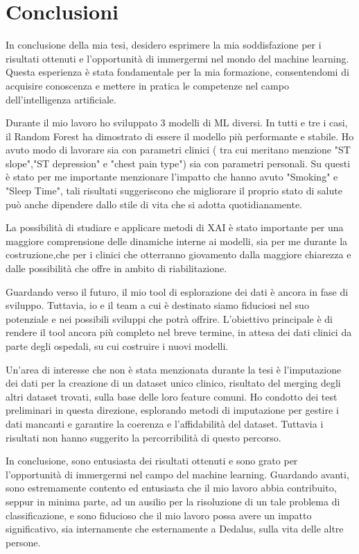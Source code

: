 \chapter*{Conclusioni}
\label{ch:conclusioni}

\begin{flushleft}
In conclusione della mia tesi, desidero esprimere la mia soddisfazione per i risultati ottenuti e l'opportunità di immergermi nel mondo del machine learning. Questa esperienza è stata fondamentale per la mia formazione, consentendomi di acquisire conoscenza e mettere in pratica le competenze nel campo dell'intelligenza artificiale.

Durante il mio lavoro ho sviluppato 3 modelli di ML diversi.  In tutti e tre i casi, il Random Forest ha dimostrato di essere il modello più performante e stabile.
Ho avuto modo di lavorare sia con parametri clinici ( tra cui meritano menzione "ST slope","ST depression" e "chest pain type") sia con parametri personali.
Su questi è stato per me importante menzionare l'impatto che hanno avuto "Smoking" e "Sleep Time", tali risultati suggeriscono che migliorare il proprio stato di salute può anche dipendere dallo stile di vita che si adotta quotidianamente.

La possibilità di studiare e applicare metodi di XAI è stato importante per una maggiore comprensione delle dinamiche interne ai modelli, sia per me durante la costruzione,che per i clinici che  otterranno giovamento dalla maggiore chiarezza
e dalle possibilità che offre in ambito di riabilitazione.

Guardando verso il futuro, il mio tool di esplorazione dei dati è ancora in fase di sviluppo. Tuttavia, io e il team a cui è destinato siamo fiduciosi nel suo potenziale e nei possibili sviluppi che potrà offrire. L'obiettivo principale è di rendere il tool ancora più completo nel breve termine, in attesa dei dati clinici da parte degli ospedali, su cui costruire i nuovi modelli.

Un'area di interesse che non è stata menzionata durante la tesi è l'imputazione dei dati per la creazione di un dataset unico clinico, risultato del merging degli altri dataset trovati, sulla base delle loro feature comuni. 
Ho condotto dei test preliminari in questa direzione, esplorando metodi di imputazione per gestire i dati mancanti e garantire la coerenza e l'affidabilità del dataset. 
Tuttavia i risultati non hanno suggerito la percorribilità di questo percorso.

In conclusione, sono entusiasta dei risultati ottenuti e sono grato per l'opportunità di immergermi nel campo del machine learning. Guardando avanti, sono estremamente contento ed entusiasta che il mio lavoro abbia contribuito, seppur in minima parte, ad un ausilio per la risoluzione di un tale problema di classificazione, e sono fiducioso che il mio lavoro possa avere un impatto significativo, sia internamente che esternamente a Dedalus, sulla vita delle altre persone.

\end{flushleft}
